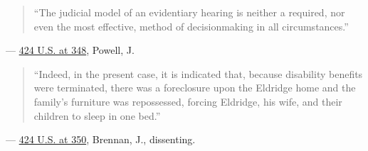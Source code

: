 \documentclass[12pt]{article}
\begin{document}
\begin{quote}
``The judicial model of an evidentiary hearing is neither a required, nor even the most effective, method of decisionmaking in all circumstances.''
\end{quote}
\noindent --- \href{https://supreme.justia.com/cases/federal/us/424/319/}{424 U.S. at 348}, Powell, J.

\begin{quote}
``Indeed, in the present case, it is indicated that, because disability benefits were terminated, there was a foreclosure upon the Eldridge home and the family's furniture was repossessed, forcing Eldridge, his wife, and their children to sleep in one bed.''
\end{quote}
\noindent --- \href{https://supreme.justia.com/cases/federal/us/424/319/}{424 U.S. at 350}, Brennan, J., dissenting.
\end{document}
